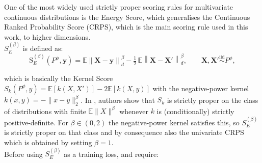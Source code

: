 
One of the most widely used strictly proper scoring rules for multivariate continuous distributions is the Energy Score, which generalises the Continuous Ranked Probability Score (CRPS), which is the main scoring rule used in this work, to higher dimensions.\\
$S_E^{(\beta)}$ is defined as:
\begin{equation}
\mathrm{S}_E^{(\beta)}(P^{\phi}, \mathbf{y}) = \mathbb{E}\left\| \mathbf{X} - \mathbf{y} \right\|_d^\beta - \tfrac{1}{2}\, \mathbb{E}\left\| \mathbf{X} - \mathbf{X}' \right\|_d^\beta, \qquad \mathbf{X}, \mathbf{X}' \stackrel{\text{iid}}{\sim} P^{\phi},
\end{equation}

which is basically the Kernel Score $S_k(P^\phi,y)=\mathbb{E}[k(X,X')]-2\mathbb{E}[k(X,y)]$ 
with the negative-power kernel $k(x,y)=-\|x-y\|_2^\beta$. 
In \cite[Thm.~4]{background:scoring_rules}, authors show that
$S_k$ is strictly proper on the class of distributions with 
finite $\mathbb{E}\|X\|^\beta$ whenever $k$ is (conditionally) 
strictly positive-definite. For $\beta\in(0,2)$ the negative-power kernel satisfies this,
so $S_E^{(\beta)}$ is strictly proper on that class and by consequence also the univariate CRPS which is obtained by setting $\beta=1$.\\ 


Before using $S_E^{(\beta)}$ as a training loss, \cite{srforgan:srforgan} and \cite{background:scoring_rules} require:
 
